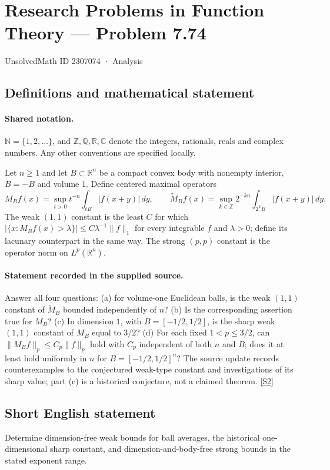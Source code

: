 \documentclass[11pt]{article}
\newcommand{\sref}[2]{\hyperlink{source:#1:#2}{[S#2]}}
\begin{document}
\setcounter{section}{2307073}
\section{Research Problems in Function Theory — Problem 7.74}\label{2307074}
{\small\sffamily UnsolvedMath ID 2307074 · Analysis}
\subsection{Definitions and mathematical statement}

\paragraph{Shared notation.}$\mathbb N=\{1,2,\ldots\}$, and $\mathbb Z,\mathbb Q,\mathbb R,\mathbb C$ denote the integers, rationals, reals and complex numbers. Any other conventions are specified locally.


Let $n\ge1$ and let $B\subset\mathbb R^n$ be a compact convex body with nonempty interior, $B=-B$ and volume $1$. Define centered maximal operators
\[M_Bf(x)=\sup_{t>0}t^{-n}\int_{tB}|f(x+y)|\,dy,
\qquad \widetilde M_Bf(x)=\sup_{k\in\mathbb Z}2^{-kn}\int_{2^kB}|f(x+y)|\,dy.
\]
The weak $(1,1)$ constant is the least $C$ for which $|\{x:M_Bf(x)>\lambda\}|\le C\lambda^{-1}\|f\|_1$ for every integrable $f$ and $\lambda>0$; define its lacunary counterpart in the same way. The strong $(p,p)$ constant is the operator norm on $L^p(\mathbb R^n)$.
\paragraph{Statement recorded in the supplied source.}
Answer all four questions: (a) for volume-one Euclidean balls, is the weak $(1,1)$ constant of $\widetilde M_B$ bounded independently of $n$? (b) Is the corresponding assertion true for $M_B$? (c) In dimension $1$, with $B=[-1/2,1/2]$, is the sharp weak $(1,1)$ constant of $M_B$ equal to $3/2$? (d) For each fixed $1<p\le3/2$, can $\|M_Bf\|_p\le C_p\|f\|_p$ hold with $C_p$ independent of both $n$ and $B$; does it at least hold uniformly in $n$ for $B=[-1/2,1/2]^n$? The source update records counterexamples to the conjectured weak-type constant and investigations of its sharp value; part (c) is a historical conjecture, not a claimed theorem. \sref{2307074}{2}
\subsection{Short English statement}
Determine dimension-free weak bounds for ball averages, the historical one-dimensional sharp constant, and dimension-and-body-free strong bounds in the stated exponent range.
\end{document}
